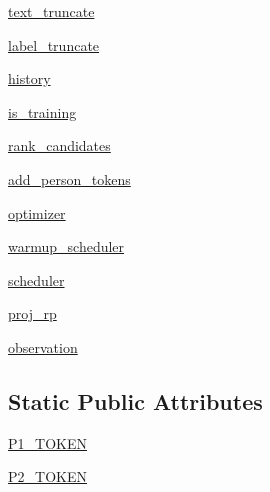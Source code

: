 \begin{DoxyCompactItemize}
\hyperlink{classparlai_1_1core_1_1torch__agent_1_1TorchAgent_ae3a69ecb5f20ce4f8a09c05c5f6f4376}{text\+\_\+truncate}
\item 
\hyperlink{classparlai_1_1core_1_1torch__agent_1_1TorchAgent_adbdd7cf2deb2c43d982c57852b83e685}{label\+\_\+truncate}
\item 
\hyperlink{classparlai_1_1core_1_1torch__agent_1_1TorchAgent_a0484b0246f0a930adc575899cdef033c}{history}
\item 
\hyperlink{classparlai_1_1core_1_1torch__agent_1_1TorchAgent_ab0bd6456c94dfd9afae73b86f05016cf}{is\+\_\+training}
\item 
\hyperlink{classparlai_1_1core_1_1torch__agent_1_1TorchAgent_a6355b9b0c0ccb24ffe1b5e3d89903cc3}{rank\+\_\+candidates}
\item 
\hyperlink{classparlai_1_1core_1_1torch__agent_1_1TorchAgent_a63011fa9bd927de8acc9ffa676caa73a}{add\+\_\+person\+\_\+tokens}
\item 
\hyperlink{classparlai_1_1core_1_1torch__agent_1_1TorchAgent_a9533344de40049bf13209739bc92199d}{optimizer}
\item 
\hyperlink{classparlai_1_1core_1_1torch__agent_1_1TorchAgent_a54d8632c546ab621c93c34f13c964726}{warmup\+\_\+scheduler}
\item 
\hyperlink{classparlai_1_1core_1_1torch__agent_1_1TorchAgent_a0affe6b199275c182a27c9aa07393347}{scheduler}
\item 
\hyperlink{classparlai_1_1core_1_1torch__agent_1_1TorchAgent_a805a9e47552d54d56f5b232ab4d5121f}{proj\+\_\+rp}
\item 
\hyperlink{classparlai_1_1core_1_1torch__agent_1_1TorchAgent_a4bc525b20568822a042b3bbfa3da3a69}{observation}
\end{DoxyCompactItemize}
\subsection*{Static Public Attributes}
\begin{DoxyCompactItemize}
\item 
\hyperlink{classparlai_1_1core_1_1torch__agent_1_1TorchAgent_a292c402279f706390ffed9a7af868abf}{P1\+\_\+\+T\+O\+K\+EN}
\item 
\hyperlink{classparlai_1_1core_1_1torch__agent_1_1TorchAgent_a81b5bf5acfa70764e3601c14a8afae85}{P2\+\_\+\+T\+O\+K\+EN}
\end{DoxyCompactItemize}


